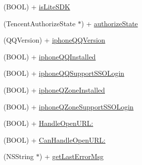 \begin{DoxyCompactItemize}
\item 
(B\+O\+OL) + \mbox{\hyperlink{interface_tencent_o_auth_a47aa5ba73ddbf7181204aa253c3a8bbf}{is\+Lite\+S\+DK}}
\item 
(Tencent\+Authorize\+State $\ast$) + \mbox{\hyperlink{interface_tencent_o_auth_a4498e8023220b1ce078cc9cc764963f1}{authorize\+State}}
\item 
(Q\+Q\+Version) + \mbox{\hyperlink{interface_tencent_o_auth_add8c96fae00aaf2c2a77e4791fb9059d}{iphone\+Q\+Q\+Version}}
\item 
(B\+O\+OL) + \mbox{\hyperlink{interface_tencent_o_auth_a482028f5e63604bf91d216c8586a89b6}{iphone\+Q\+Q\+Installed}}
\item 
(B\+O\+OL) + \mbox{\hyperlink{interface_tencent_o_auth_a7b5a02acedd8dc2b33135cfb863c2828}{iphone\+Q\+Q\+Support\+S\+S\+O\+Login}}
\item 
(B\+O\+OL) + \mbox{\hyperlink{interface_tencent_o_auth_a197f6599acf18b3b36745f4d78614537}{iphone\+Q\+Zone\+Installed}}
\item 
(B\+O\+OL) + \mbox{\hyperlink{interface_tencent_o_auth_a981268c1a6133c1fb6cd378a98de0b5c}{iphone\+Q\+Zone\+Support\+S\+S\+O\+Login}}
\item 
(B\+O\+OL) + \mbox{\hyperlink{interface_tencent_o_auth_a3f72fb9aa1d4848672de15ac3656bf39}{Handle\+Open\+U\+R\+L\+:}}
\item 
(B\+O\+OL) + \mbox{\hyperlink{interface_tencent_o_auth_aab5162f1fbcce989d43da562243de69d}{Can\+Handle\+Open\+U\+R\+L\+:}}
\item 
(N\+S\+String $\ast$) + \mbox{\hyperlink{interface_tencent_o_auth_ada49d962f50bfadf8b3a7eb96420c684}{get\+Last\+Error\+Msg}}
\end{DoxyCompactItemize}
